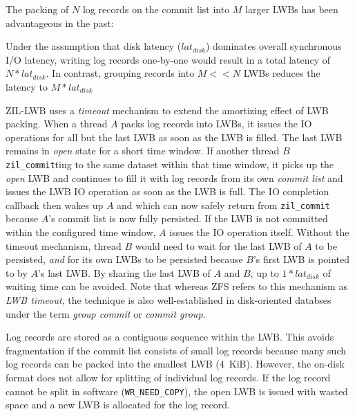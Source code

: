 \documentclass[12pt,a4paper,twoside]{book}
\begin{document}
The packing of $N$ log records on the commit list into $M$ larger LWBs has been advantageous in the past:
\begin{description}[noitemsep]
    \item[Latency Amortization]
        Under the assumption that disk latency ($lat_{disk}$) dominates overall synchronous I/O latency, writing log records one-by-one would result in a total latency of $N * lat_{disk}$.
        In contrast, grouping records into $M << N$ LWBs reduces the latency to $M * lat_{disk}$
    \item[LWB Timeout / Group Commit]
        ZIL-LWB uses a \textit{timeout} mechanism to extend the amortizing effect of LWB packing.
        When a thread $A$ packs log records into LWBs, it issues the IO operations for all but the last LWB as soon as the LWB is filled.
        The last LWB remains in \textit{open} state for a short time window.
        If another thread $B$ \lstinline{zil_commit}ting to the same dataset within that time window, it picks up the \textit{open} LWB and continues to fill it with log records from its own \textit{commit list} and issues the LWB IO operation as soon as the LWB is full.
        The IO completion callback then wakes up $A$ and which can now safely return from \lstinline{zil_commit} because $A$'s commit list is now fully persisted.
        If the LWB is not committed within the configured time window, $A$ issues the IO operation itself.
        Without the timeout mechanism, thread $B$ would need to wait for the last LWB of $A$ to be persisted, \textit{and} for its own LWBs to be persisted because $B$'s first LWB is pointed to by $A$'s last LWB.
        By sharing the last LWB of $A$ and $B$, up to $1 * lat_{disk}$ of waiting time can be avoided.
        Note that whereas ZFS refers to this mechanism as \textit{LWB timeout}, the technique is also well-established in disk-oriented databses under the term \textit{group commit} or \textit{commit group}.
    \item[Space Efficiency]
        Log records are stored as a contiguous sequence within the LWB.
        This avoids fragmentation if the commit list consists of small log records because many such log records can be packed into the smallest LWB (\SI{4}{KiB}).
        However, the on-disk format does not allow for splitting of individual log records.
        If the log record cannot be split in software (\lstinline{WR_NEED_COPY}), the open LWB is issued with wasted space and a new LWB is allocated for the log record.
\end{description}
\end{document}
